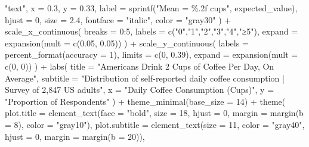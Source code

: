 \documentclass[
  letterpaper,
  DIV=11,
  numbers=noendperiod]{scrreprt}
\newenvironment{Shaded}{\begin{snugshade}}{\end{snugshade}}
\newcommand{\AttributeTok}[1]{\textcolor[rgb]{0.40,0.45,0.13}{#1}}
\newcommand{\DecValTok}[1]{\textcolor[rgb]{0.68,0.00,0.00}{#1}}
\newcommand{\FloatTok}[1]{\textcolor[rgb]{0.68,0.00,0.00}{#1}}
\newcommand{\FunctionTok}[1]{\textcolor[rgb]{0.28,0.35,0.67}{#1}}
\newcommand{\NormalTok}[1]{\textcolor[rgb]{0.00,0.23,0.31}{#1}}
\newcommand{\SpecialCharTok}[1]{\textcolor[rgb]{0.37,0.37,0.37}{#1}}
\newcommand{\StringTok}[1]{\textcolor[rgb]{0.13,0.47,0.30}{#1}}
\begin{document}
\begin{Shaded}
\begin{Highlighting}[]
    \StringTok{"text"}\NormalTok{,}
    \AttributeTok{x =} \FloatTok{0.3}\NormalTok{, }\AttributeTok{y =} \FloatTok{0.33}\NormalTok{,}
    \AttributeTok{label =} \FunctionTok{sprintf}\NormalTok{(}\StringTok{"Mean = \%.2f cups"}\NormalTok{, expected\_value),}
    \AttributeTok{hjust =} \DecValTok{0}\NormalTok{,}
    \AttributeTok{size =} \FloatTok{2.4}\NormalTok{,}
    \AttributeTok{fontface =} \StringTok{"italic"}\NormalTok{,}
    \AttributeTok{color =} \StringTok{"gray30"}
\NormalTok{  ) }\SpecialCharTok{+}
  \FunctionTok{scale\_x\_continuous}\NormalTok{(}
    \AttributeTok{breaks =} \DecValTok{0}\SpecialCharTok{:}\DecValTok{5}\NormalTok{,}
    \AttributeTok{labels =} \FunctionTok{c}\NormalTok{(}\StringTok{"0"}\NormalTok{,}\StringTok{"1"}\NormalTok{,}\StringTok{"2"}\NormalTok{,}\StringTok{"3"}\NormalTok{,}\StringTok{"4"}\NormalTok{,}\StringTok{"≥5"}\NormalTok{),}
    \AttributeTok{expand =} \FunctionTok{expansion}\NormalTok{(}\AttributeTok{mult =} \FunctionTok{c}\NormalTok{(}\FloatTok{0.05}\NormalTok{, }\FloatTok{0.05}\NormalTok{))}
\NormalTok{  ) }\SpecialCharTok{+}
  \FunctionTok{scale\_y\_continuous}\NormalTok{(}
    \AttributeTok{labels =} \FunctionTok{percent\_format}\NormalTok{(}\AttributeTok{accuracy =} \DecValTok{1}\NormalTok{),}
    \AttributeTok{limits =} \FunctionTok{c}\NormalTok{(}\DecValTok{0}\NormalTok{, }\FloatTok{0.39}\NormalTok{),}
    \AttributeTok{expand =} \FunctionTok{expansion}\NormalTok{(}\AttributeTok{mult =} \FunctionTok{c}\NormalTok{(}\DecValTok{0}\NormalTok{, }\DecValTok{0}\NormalTok{))}
\NormalTok{  ) }\SpecialCharTok{+}
  \FunctionTok{labs}\NormalTok{(}
    \AttributeTok{title =} \StringTok{"Americans Drink 2 Cups of Coffee Per Day, On Average"}\NormalTok{,}
    \AttributeTok{subtitle =} \StringTok{"Distribution of self{-}reported daily coffee consumption | Survey of 2,847 US adults"}\NormalTok{,}
    \AttributeTok{x =} \StringTok{"Daily Coffee Consumption (Cups)"}\NormalTok{,}
    \AttributeTok{y =} \StringTok{"Proportion of Respondents"}
\NormalTok{  ) }\SpecialCharTok{+}
  \FunctionTok{theme\_minimal}\NormalTok{(}\AttributeTok{base\_size =} \DecValTok{14}\NormalTok{) }\SpecialCharTok{+}
  \FunctionTok{theme}\NormalTok{(}
    \AttributeTok{plot.title =} \FunctionTok{element\_text}\NormalTok{(}\AttributeTok{face =} \StringTok{"bold"}\NormalTok{, }\AttributeTok{size =} \DecValTok{18}\NormalTok{, }\AttributeTok{hjust =} \DecValTok{0}\NormalTok{, }\AttributeTok{margin =} \FunctionTok{margin}\NormalTok{(}\AttributeTok{b =} \DecValTok{8}\NormalTok{), }\AttributeTok{color =} \StringTok{"gray10"}\NormalTok{),}
    \AttributeTok{plot.subtitle =} \FunctionTok{element\_text}\NormalTok{(}\AttributeTok{size =} \DecValTok{11}\NormalTok{, }\AttributeTok{color =} \StringTok{"gray40"}\NormalTok{, }\AttributeTok{hjust =} \DecValTok{0}\NormalTok{, }\AttributeTok{margin =} \FunctionTok{margin}\NormalTok{(}\AttributeTok{b =} \DecValTok{20}\NormalTok{)),}

\end{Highlighting}
\end{Shaded}
\end{document}
